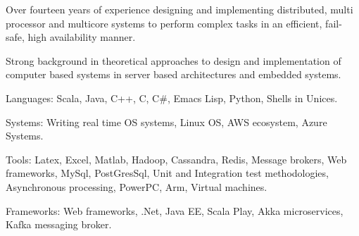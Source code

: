 

\begin{cventries}

\cventryOnlyDescription
      {\begin{cvitems} %
        \item {Over fourteen years of experience designing and implementing distributed, multi processor and multicore systems to perform complex tasks in an efficient, fail-safe, high availability manner.}
        \item {Strong background in theoretical approaches to design and implementation of computer based systems in server based architectures and embedded systems.}
	\item {Languages: Scala, Java, C++, C, C\#, Emacs Lisp, Python, Shells in Unices.}
	\item {Systems: Writing real time OS systems, Linux OS, AWS ecosystem, Azure Systems.}
	\item {Tools: Latex, Excel, Matlab, Hadoop, Cassandra, Redis, Message brokers, Web frameworks, MySql, PostGresSql, Unit and Integration test methodologies, Asynchronous processing, PowerPC, Arm, Virtual machines.}
	\item {Frameworks: Web frameworks, .Net, Java EE, Scala Play, Akka microservices, Kafka messaging broker.}
       \end{cvitems}
      }
\end{cventries}
